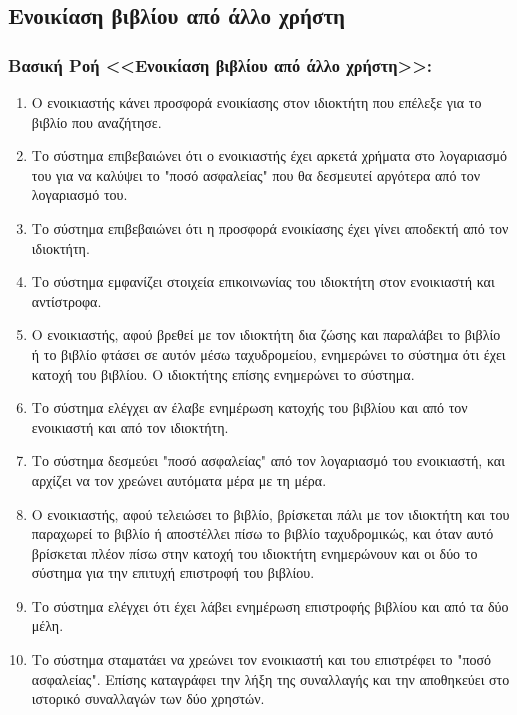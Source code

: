 \documentclass[12pt,a4paper]{article}
\begin{document}
\subsection{Ενοικίαση βιβλίου από άλλο χρήστη}
\label{Rental Use Case}
\subsubsection*{Βασική Ροή <<Ενοικίαση βιβλίου από άλλο χρήστη>>:}
\begin{enumerate}
    \item Ο ενοικιαστής κάνει προσφορά ενοικίασης στον ιδιοκτήτη που επέλεξε για το βιβλίο που αναζήτησε.
        \label{Επιλογή τρόπου συναλλαγής}
    \item Το σύστημα επιβεβαιώνει ότι ο ενοικιαστής έχει αρκετά χρήματα στο λογαριασμό του για να καλύψει το "ποσό ασφαλείας" που θα δεσμευτεί αργότερα από τον λογαριασμό του.
        \label{Έλεγχος ποσού ασφαλείας}
    \item Το σύστημα επιβεβαιώνει ότι η προσφορά ενοικίασης έχει γίνει αποδεκτή από τον ιδιοκτήτη.
        \label{Αποδοχή ή απόρριψη συναλλαγής}
    \item Το σύστημα εμφανίζει στοιχεία επικοινωνίας του ιδιοκτήτη στον ενοικιαστή και αντίστροφα.
    \item Ο ενοικιαστής, αφού βρεθεί με τον ιδιοκτήτη δια ζώσης και παραλάβει το βιβλίο ή το βιβλίο φτάσει σε αυτόν μέσω ταχυδρομείου, ενημερώνει το σύστημα ότι έχει κατοχή του βιβλίου. Ο ιδιοκτήτης επίσης ενημερώνει το σύστημα.
    \item Το σύστημα ελέγχει αν έλαβε ενημέρωση κατοχής του βιβλίου και από τον ενοικιαστή και από τον ιδιοκτήτη.
        \label {Δεν ενημερώνεται η κατοχή}
    \item Το σύστημα δεσμεύει "ποσό ασφαλείας" από τον λογαριασμό του ενοικιαστή, και αρχίζει να τον χρεώνει αυτόματα μέρα με τη μέρα.
        \label{Τέλος dispute resolved - Τέλος χρημάτων}
    \item Ο ενοικιαστής, αφού τελειώσει το βιβλίο, βρίσκεται πάλι με τον ιδιοκτήτη και του παραχωρεί το βιβλίο ή αποστέλλει πίσω το βιβλίο ταχυδρομικώς, και όταν αυτό βρίσκεται πλέον πίσω στην κατοχή του ιδιοκτήτη ενημερώνουν και οι δύο το σύστημα για την επιτυχή επιστροφή του βιβλίου.
        \label{Επιστροφή βιβλίου - Τέλος λεφτά δεν φτάνουν}
    \item Το σύστημα ελέγχει ότι έχει λάβει ενημέρωση επιστροφής βιβλίου και από τα δύο μέλη. 
    \item Το σύστημα σταματάει να χρεώνει τον ενοικιαστή και του επιστρέφει το "ποσό ασφαλείας". Επίσης καταγράφει την λήξη της συναλλαγής και την αποθηκεύει στο ιστορικό συναλλαγών των δύο χρηστών.
        \label{Τέλος ενοικίασης}
\end{enumerate}
\end{document}
